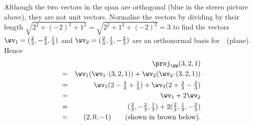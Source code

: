 \begin{example}
\begin{enumerate}
{{}}%
\begin{center}\end{center}
\begin{solution} 
Although the two vectors in the span are orthogonal (blue in the stereo picture above), they are not unit vectors.  
Normalise the vectors by dividing by their length \(\sqrt{2^2+(-2)^2+1^2}=\sqrt{2^2+1^2+(-2)^2}=3\) to find the vectors \(\wv_1=(\frac23,-\frac23,\frac13)\) and  \(\wv_2=(\frac23,\frac13,-\frac23)\) are an orthonormal basis for~\WW\ (plane).
Hence 
\begin{eqnarray*}
&&\proj_\WW(3,2,1)
\\&=&\wv_1(\wv_1\cdot(3,2,1))+\wv_2(\wv_2\cdot(3,2,1))
\\&=&\wv_1(2-\tfrac43+\tfrac13)
+\wv_2(2+\tfrac23-\tfrac23)
\\&=&\wv_1+2\wv_2
\\&=&(\tfrac23,-\tfrac23,\tfrac13)+2(\tfrac23,\tfrac13,-\tfrac23)
\\&=&(2,0,-1) 
\qquad(\text{shown in brown below}).
\end{eqnarray*}%
\begin{center}\end{center}
\end{solution}


\end{enumerate}
\end{example}
